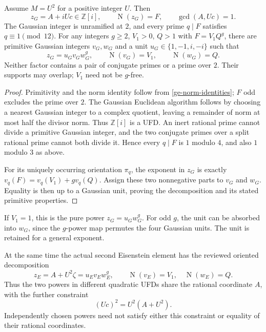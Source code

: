 \begin{theorem}\label{ge-gaussian-lift}
Assume $M=U^2$ for a positive integer $U$. Then
\begin{equation}\label{ge-gaussian-element}
 z_G=A+iUc\in\mathbb Z[i],\qquad
 \operatorname N(z_G)=F,\qquad \gcd(A,Uc)=1.
\end{equation}
The Gaussian integer is unramified at $2$, and every prime $q\mid F$
satisfies $q\equiv1\pmod{12}$.
For any integers $g\ge2$, $V_1>0$, $Q>1$ with $F=V_1Q^g$, there are
primitive Gaussian integers $v_G,w_G$ and a unit $u_G\in\{1,-1,i,-i\}$
such that
\begin{equation}\label{ge-gaussian-profile}
 z_G=u_Gv_Gw_G^g,\qquad
 \operatorname N(v_G)=V_1,\qquad \operatorname N(w_G)=Q.
\end{equation}
Neither factor contains a pair of conjugate primes or a prime over $2$.
Their supports may overlap; $V_1$ need not be $g$-free.
\end{theorem}
\begin{proof}
Primitivity and the norm identity follow from
\eqref{ge-norm-identities}; $F$ odd excludes the prime over $2$.
The Gaussian Euclidean algorithm follows by choosing a nearest Gaussian
integer to a complex quotient, leaving a remainder of norm at most half
the divisor norm. Thus $\mathbb Z[i]$ is a UFD. An inert rational prime
cannot divide a primitive Gaussian integer, and the two conjugate primes
over a split rational prime cannot both divide it. Hence every $q\mid F$
is $1$ modulo $4$, and also $1$ modulo $3$ as above.

For its uniquely occurring orientation $\pi_q$, the exponent in $z_G$
is exactly
$v_q(F)=v_q(V_1)+g v_q(Q)$. Assign these two nonnegative parts to
$v_G$ and $w_G$. Equality is then up to a Gaussian unit, proving the
decomposition and its stated primitive properties.
\end{proof}
If $V_1=1$, this is the pure power $z_G=u_Gw_G^g$. For odd $g$, the
unit can be absorbed into $w_G$, since the $g$-power map permutes the
four Gaussian units. The unit is retained for a general exponent.

At the same time the actual second Eisenstein element has the reviewed
oriented decomposition
\begin{equation}\label{ge-two-domains}
 z_E=A+U^2\zeta=u_Ev_Ew_E^g,
 \qquad \operatorname N(v_E)=V_1,\quad\operatorname N(w_E)=Q.
\end{equation}
Thus the two powers in different quadratic UFDs share the rational
coordinate $A$, with the further constraint
\begin{equation}\label{ge-shared-coordinate}
 (Uc)^2=U^2(A+U^2).
\end{equation}
Independently chosen powers need not satisfy either this constraint or
equality of their rational coordinates.

